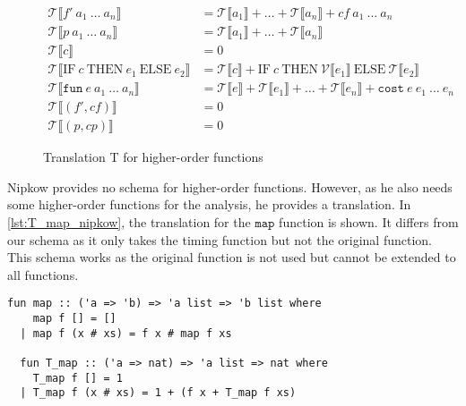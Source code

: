 \begin{figure}
  \begin{align*}
    \mathcal{T}\llbracket f'\ a_{1}\ \dots\ a_{n}\rrbracket &= \mathcal{T}\llbracket a_{1}\rrbracket + \dots + \mathcal{T}\llbracket a_{n}\rrbracket + cf\ a_{1}\ \dots\ a_{n}\\
    \mathcal{T}\llbracket p\ a_{1}\ \dots\ a_{n}\rrbracket &= \mathcal{T}\llbracket a_{1}\rrbracket + \dots + \mathcal{T}\llbracket a_{n}\rrbracket\\
    \mathcal{T}\llbracket c \rrbracket &= 0\\
    \mathcal{T}\llbracket \text{IF}\ c\ \text{THEN}\ e_{1}\ \text{ELSE}\ e_{2}\rrbracket &= \mathcal{T}\llbracket c\rrbracket + \text{IF}\  c\ \text{THEN}\ \mathcal{V}\llbracket e_{1}\rrbracket\ \text{ELSE}\ \mathcal{T}\llbracket e_{2}\rrbracket\\
    \mathcal{T}\llbracket\texttt{fun}\ e\ a_{1}\ \dots\ a_{n}\rrbracket &= \mathcal{T}\llbracket e\rrbracket + \mathcal{T}\llbracket e_{1}\rrbracket + \dots + \mathcal{T}\llbracket e_{n}\rrbracket + \texttt{cost}\ e\ e_{1}\ \dots\ e_{n}\\
    \mathcal{T}\llbracket (f',cf)\rrbracket &= 0\\
    \mathcal{T}\llbracket (p,cp)\rrbracket &= 0
  \end{align*}
  \caption{Translation T for higher-order functions}
  \label{fig:higher_T}
\end{figure}

Nipkow provides no schema for higher-order functions.
However, as he also needs some higher-order functions for the analysis, he provides a translation.
In \autoref{lst:T_map_nipkow}, the translation for the $\texttt{map}$ function is shown.
It differs from our schema as it only takes the timing function but not the original function.
This schema works as the original function is not used but cannot be extended to all functions.
\begin{lstlisting}[language=isabelle,mathescape=true,caption=Translation of the function map to their timing function by Nipkow,label=lst:T_map_nipkow]
  fun map :: ('a => 'b) => 'a list => 'b list where
    map f [] = []
  | map f (x # xs) = f x # map f xs

  fun T_map :: ('a => nat) => 'a list => nat where
    T_map f [] = 1
  | T_map f (x # xs) = 1 + (f x + T_map f xs)
\end{lstlisting}
